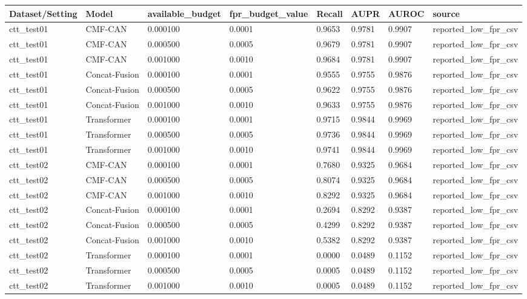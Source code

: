 \begin{tabular}{llllllll}
\toprule
Dataset/Setting & Model & available_budget & fpr_budget_value & Recall & AUPR & AUROC & source \\
\midrule
ctt_test01 & CMF-CAN & 0.000100 & 0.0001 & 0.9653 & 0.9781 & 0.9907 & reported_low_fpr_csv \\
ctt_test01 & CMF-CAN & 0.000500 & 0.0005 & 0.9679 & 0.9781 & 0.9907 & reported_low_fpr_csv \\
ctt_test01 & CMF-CAN & 0.001000 & 0.0010 & 0.9684 & 0.9781 & 0.9907 & reported_low_fpr_csv \\
ctt_test01 & Concat-Fusion & 0.000100 & 0.0001 & 0.9555 & 0.9755 & 0.9876 & reported_low_fpr_csv \\
ctt_test01 & Concat-Fusion & 0.000500 & 0.0005 & 0.9622 & 0.9755 & 0.9876 & reported_low_fpr_csv \\
ctt_test01 & Concat-Fusion & 0.001000 & 0.0010 & 0.9633 & 0.9755 & 0.9876 & reported_low_fpr_csv \\
ctt_test01 & Transformer & 0.000100 & 0.0001 & 0.9715 & 0.9844 & 0.9969 & reported_low_fpr_csv \\
ctt_test01 & Transformer & 0.000500 & 0.0005 & 0.9736 & 0.9844 & 0.9969 & reported_low_fpr_csv \\
ctt_test01 & Transformer & 0.001000 & 0.0010 & 0.9741 & 0.9844 & 0.9969 & reported_low_fpr_csv \\
ctt_test02 & CMF-CAN & 0.000100 & 0.0001 & 0.7680 & 0.9325 & 0.9684 & reported_low_fpr_csv \\
ctt_test02 & CMF-CAN & 0.000500 & 0.0005 & 0.8074 & 0.9325 & 0.9684 & reported_low_fpr_csv \\
ctt_test02 & CMF-CAN & 0.001000 & 0.0010 & 0.8292 & 0.9325 & 0.9684 & reported_low_fpr_csv \\
ctt_test02 & Concat-Fusion & 0.000100 & 0.0001 & 0.2694 & 0.8292 & 0.9387 & reported_low_fpr_csv \\
ctt_test02 & Concat-Fusion & 0.000500 & 0.0005 & 0.4299 & 0.8292 & 0.9387 & reported_low_fpr_csv \\
ctt_test02 & Concat-Fusion & 0.001000 & 0.0010 & 0.5382 & 0.8292 & 0.9387 & reported_low_fpr_csv \\
ctt_test02 & Transformer & 0.000100 & 0.0001 & 0.0000 & 0.0489 & 0.1152 & reported_low_fpr_csv \\
ctt_test02 & Transformer & 0.000500 & 0.0005 & 0.0005 & 0.0489 & 0.1152 & reported_low_fpr_csv \\
ctt_test02 & Transformer & 0.001000 & 0.0010 & 0.0005 & 0.0489 & 0.1152 & reported_low_fpr_csv \\

\end{tabular}
